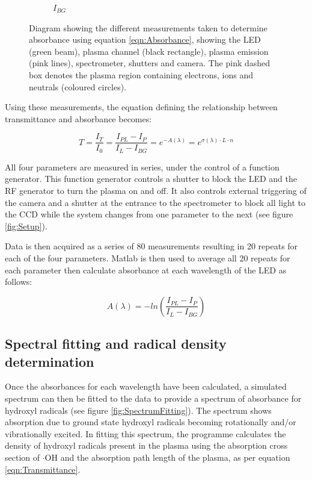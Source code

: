 \documentclass[11pt, oneside]{article}   	%
\begin{document}
\begin{figure}
\begin{subfigure}{0.45\textwidth}
    		\caption{$I_{BG}$}
    		\label{subfig:Ibg}
	\end{subfigure}
	\caption{Diagram showing the different measurements taken to determine absorbance using equation \ref{eqn:Absorbance}, showing the LED (green beam), plasma channel (black rectangle), plasma emission (pink lines), spectrometer, shutters and camera. The pink dashed box denotes the plasma region containing electrons, ions and neutrals (coloured circles).}
\end{figure}

Using these measurements, the equation defining the relationship between transmittance and absorbance becomes:

\begin{equation} \label{eqn:4ParamTransmittance}
    T = \frac{I_T}{I_0} = \frac{I_{PL} - I_P}{I_L - I_{BG}} = e^{-A(\lambda)} = e^{\sigma(\lambda) \cdot L \cdot n}
\end{equation}

All four parameters are measured in series, under the control of a function generator.
This function generator controls a shutter to block the LED and the RF generator to turn the plasma on and off. It also controls external triggering of the camera and a shutter at the entrance to the spectrometer to block all light to the CCD while the system changes from one parameter to the next (see figure \ref{fig:Setup}). 

Data is then acquired as a series of 80 measurements resulting in 20 repeats for each of the four parameters.
Matlab is then used to average all 20 repeats for each parameter then calculate absorbance at each wavelength of the LED as follows:

\begin{equation}\label{eqn:Absorbance}
    A(\lambda) = -ln(\frac{I_{PL} - I_P}{I_L - I_{BG}})
\end{equation}

\subsection{Spectral fitting and radical density determination}

Once the absorbances for each wavelength have been calculated, a simulated spectrum can then be fitted to the data to provide a spectrum of absorbance for hydroxyl radicals (see figure \ref{fig:SpectrumFitting}). 
The spectrum shows absorption due to ground state hydroxyl radicals becoming rotationally and/or vibrationally excited.
In fitting this spectrum, the programme calculates the density of hydroxyl radicals present in the plasma using the absorption cross section of $\cdot$OH and the absorption path length of the plasma, as per equation \ref{eqn:Transmittance}.
\end{document}
